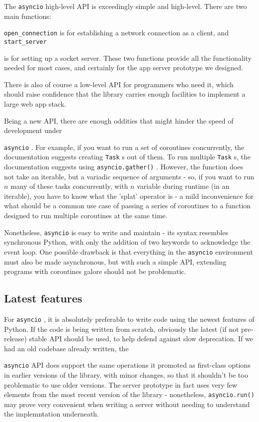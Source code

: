 \documentclass[letterpaper,twocolumn,10pt]{article}
\newcommand{\code}[1]{
    \texttt{#1}
}
\begin{document}
The \code{asyncio} high-level API is exceedingly simple and high-level.  There are two main functions:
\code{open_connection} is for establishing a network connection as a client, and \code{start_server}
is for setting up a socket server.  These two functions provide all the functionality needed for most
cases, and certainly for the app server prototype we designed.

There is also of course a low-level API for programmers who need it, which should raise confidence that
the library carries enough facilities to implement a large web app stack.

Being a new API, there are enough oddities that might hinder the speed of development under 
\code{asyncio}.  For example, if you want to run a set of coroutines concurrently, the documentation
suggests creating \code{Task}s out of them.  To run multiple \code{Task}s, the documentation suggests
using \code{asyncio.gather()}.  However, the function does not take an iterable, but a variadic 
sequence of arguments - so, if you want to run $n$ many of these tasks concurrently, with $n$ variable 
during runtime (in an iterable), you have to know what the 'splat' operator is - a mild inconvenience
for what should be a common use case of passing a series of coroutines to a function designed to
run multiple coroutines at the same time.

Nonetheless, \code{asyncio} is easy to write and maintain - its syntax resembles synchronous Python,
with only the addition of two keywords to acknowledge the event loop.  One possible drawback is that
everything in the \code{asyncio} environment must also be made asynchronous, but with such a simple
API, extending programs with coroutines galore should not be problematic.

\subsection{Latest features}

For \code{asyncio}, it is absolutely preferable to write code using the newest features of Python.  If
the code is being written from scratch, obviously the latest (if not pre-release) stable API should be
used, to help defend against slow deprecation.  If we had an old codebase already written, the
\code{asyncio} API does support the same operations it promoted as first-class options in earlier
versions of the library, with minor changes, so that it shouldn't be too problematic to use older
versions.  The server prototype in fact uses very few elements from the most recent version of the
library - nonetheless, \code{asyncio.run()} may prove very convenient when writing a server without
needing to understand the implemntation underneath.
\end{document}

